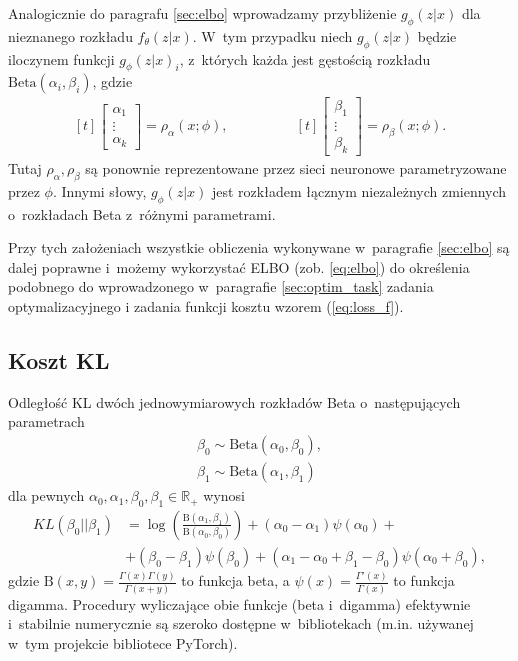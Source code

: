 \documentclass{iithesis}
\begin{document}
Analogicznie do paragrafu \ref{sec:elbo} wprowadzamy przybliżenie $g_\phi(z|x)$
dla nieznanego rozkładu $f_\theta(z|x)$. W~tym przypadku niech $g_\phi(z|x)$
będzie iloczynem funkcji $g_\phi(z|x)_i$, z~których każda jest gęstością rozkładu
$\text{Beta}(\alpha_i, \beta_i)$, gdzie
\begin{equation*}
\begin{aligned}[t]
\begin{bmatrix}
\alpha_1 \\
\vdots \\
\alpha_k
\end{bmatrix}
= \rho_\alpha(x;\phi),
\end{aligned}
\qquad \qquad
\begin{aligned}[t]
\begin{bmatrix}
\beta_1 \\
\vdots \\
\beta_k
\end{bmatrix}
= \rho_\beta(x;\phi).
\end{aligned}
\end{equation*}
Tutaj $\rho_\alpha,\rho_\beta$ są ponownie reprezentowane przez sieci neuronowe
parametryzowane przez $\phi$. Innymi słowy, $g_\phi(z|x)$ jest rozkładem łącznym
niezależnych zmiennych o~rozkładach Beta z~różnymi parametrami.

Przy tych założeniach wszystkie obliczenia wykonywane w~paragrafie \ref{sec:elbo}
są dalej poprawne i~możemy wykorzystać ELBO (zob. \ref{eq:elbo}) do
określenia podobnego do wprowadzonego w~paragrafie \ref{sec:optim_task} zadania optymalizacyjnego
i zadania funkcji kosztu wzorem (\ref{eq:loss_f}).

\subsection{Koszt KL}
Odległość KL dwóch jednowymiarowych rozkładów Beta o~następujących parametrach
\begin{equation*}
\begin{split}
\beta_0 \sim \text{Beta}(\alpha_0, \beta_0), \\
\beta_1 \sim \text{Beta}(\alpha_1, \beta_1)
\end{split}
\end{equation*}
dla pewnych $\alpha_0,\alpha_1,\beta_0,\beta_1 \in \mathbb{R}_{+}$ wynosi
\begin{equation} \label{eq:univariate_beta_kl}
\begin{split}
KL(\beta_0 || \beta_1) &= \log \left( \frac{\text{B}(\alpha_1,\beta_1)}{\text{B}(\alpha_0,\beta_0)} \right)
+ (\alpha_0-\alpha_1)\psi(\alpha_0) +\\
&+ (\beta_0-\beta_1)\psi(\beta_0) + (\alpha_1-\alpha_0+\beta_1-\beta_0)\psi(\alpha_0+\beta_0),
\end{split}
\end{equation}
gdzie $\text{B}(x,y)=\frac{\Gamma(x)\Gamma(y)}{\Gamma(x+y)}$ to funkcja beta,
a $\psi(x)=\frac{\Gamma'(x)}{\Gamma(x)}$ to funkcja digamma.
Procedury wyliczające obie funkcje (beta i~digamma) efektywnie i~stabilnie numerycznie
są szeroko dostępne w~bibliotekach (m.in. używanej w~tym projekcie bibliotece PyTorch).
\end{document}
